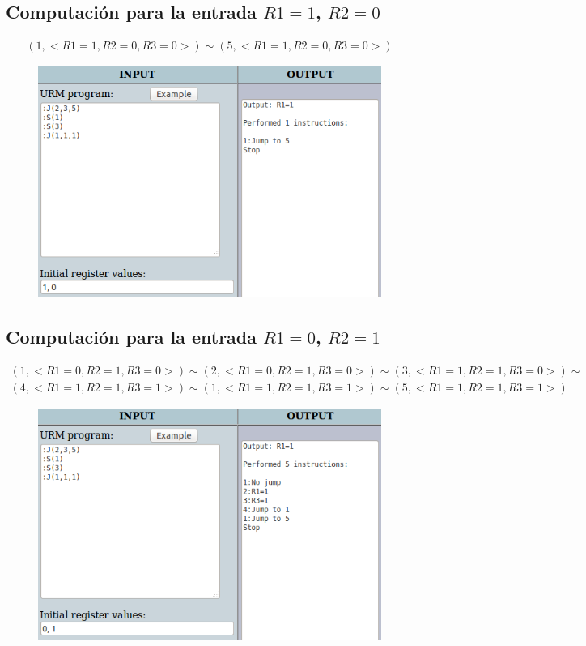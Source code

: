 		\subsection{Computación para la entrada $R1=1$, $R2=0$}
		\begin{equation*}\begin{gathered}
		(1, <R1=1, R2=0, R3=0>) \sim (5, <R1=1, R2=0, R3=0>)
		\end{gathered}\end{equation*}
		\begin{figure}[H]
  			\centering
  			\includegraphics[scale=0.5]{images/510.png}
  		\end{figure}
		\subsection{Computación para la entrada $R1=0$, $R2=1$}
		\begin{equation*}\begin{gathered}
		(1, <R1=0, R2=1, R3=0>) \sim (2, <R1=0, R2=1, R3=0>) \sim (3, <R1=1, R2=1, R3=0>) \sim\\
		(4, <R1=1, R2=1, R3=1>) \sim (1, <R1=1, R2=1, R3=1>) \sim (5, <R1=1, R2=1, R3=1>)
		\end{gathered}\end{equation*}
		\begin{figure}[H]
  			\centering
  			\includegraphics[scale=0.5]{images/501.png}
  		\end{figure}
